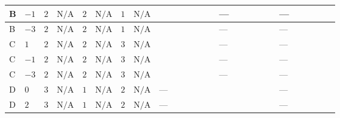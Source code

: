 \documentclass[8pt]{article}
\begin{document}
\begin{landscape}
\begin{longtable}{@{}llcccccc >{\raggedright\arraybackslash}p{0.21\linewidth} >{\raggedright\arraybackslash}p{0.21\linewidth} >{\raggedright\arraybackslash}p{0.21\linewidth}@{}}
\midrule
B & $-1$ & $2$ & $\text{N/A}$ & $2$ & $\text{N/A}$ & $1$ & $\text{N/A}$ & \scriptsize\adjustbox{max width=\linewidth}{$\begin{gathered} -3 {g_1}^2 {\lambda_5}\end{gathered}$} & --- & --- \\
\midrule
B & $-3$ & $2$ & $\text{N/A}$ & $2$ & $\text{N/A}$ & $1$ & $\text{N/A}$ & \scriptsize\adjustbox{max width=\linewidth}{$\begin{gathered} -9 {g_1}^2 {\lambda_5}\end{gathered}$} & --- & --- \\
\midrule
C & $1$ & $2$ & $\text{N/A}$ & $2$ & $\text{N/A}$ & $3$ & $\text{N/A}$ & \scriptsize\adjustbox{max width=\linewidth}{$\begin{gathered} -9 {g_1}^2 {\lambda_5}\end{gathered}$} & --- & --- \\
\midrule
C & $-1$ & $2$ & $\text{N/A}$ & $2$ & $\text{N/A}$ & $3$ & $\text{N/A}$ & \scriptsize\adjustbox{max width=\linewidth}{$\begin{gathered} -3 {g_1}^2 {\lambda_5}\end{gathered}$} & --- & --- \\
\midrule
C & $-3$ & $2$ & $\text{N/A}$ & $2$ & $\text{N/A}$ & $3$ & $\text{N/A}$ & \scriptsize\adjustbox{max width=\linewidth}{$\begin{gathered} -9 {g_1}^2 {\lambda_5}\end{gathered}$} & --- & --- \\
\midrule
D & $0$ & $3$ & $\text{N/A}$ & $1$ & $\text{N/A}$ & $2$ & $\text{N/A}$ & --- & \scriptsize\adjustbox{max width=\linewidth}{$\begin{gathered} {\lambda_5} (6 \operatorname{Tr}\!\left({Y_d}\,\left({Y_d}\right)^{\dagger}\right)+2 \operatorname{Tr}\!\left({Y_e}\,\left({Y_e}\right)^{\dagger}\right)+6 \operatorname{Tr}\!\left({Y_u}\,\left({Y_u}\right)^{\dagger}\right)-4 {\lambda_{HS_1}^{(A)}})\end{gathered}$} & --- \\
\midrule
D & $2$ & $3$ & $\text{N/A}$ & $1$ & $\text{N/A}$ & $2$ & $\text{N/A}$ & --- & \scriptsize\adjustbox{max width=\linewidth}{$\begin{gathered} {\lambda_5} (6 \operatorname{Tr}\!\left({Y_d}\,\left({Y_d}\right)^{\dagger}\right)+2 \operatorname{Tr}\!\left({Y_e}\,\left({Y_e}\right)^{\dagger}\right)+6 \operatorname{Tr}\!\left({Y_u}\,\left({Y_u}\right)^{\dagger}\right)-4 {\lambda_{HS_1}^{(A)}})\end{gathered}$} & --- \\

\end{longtable}
\end{landscape}
\end{document}
